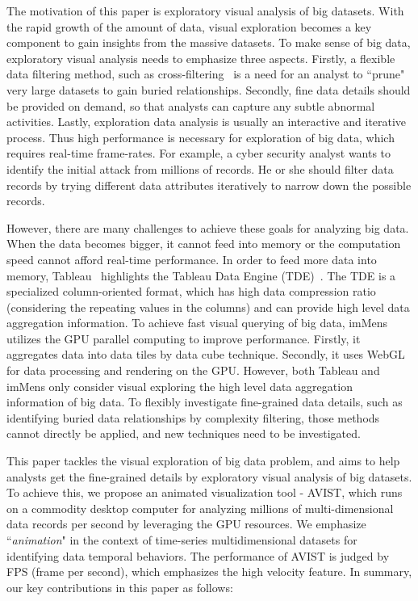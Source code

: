
\maketitle


The motivation of this paper is exploratory visual analysis of big datasets.  With the rapid growth of the amount of data,  visual exploration becomes a key component to gain insights from the massive datasets. To make sense of big data, exploratory visual analysis needs to emphasize three aspects. Firstly, a flexible data filtering method, such as cross-filtering~\cite{ weaver2008, weaver2010} is a need for an analyst to ``prune" very large datasets to gain buried relationships. Secondly, fine data details should be provided on demand, so that analysts can capture any subtle abnormal activities. Lastly, exploration data analysis is usually an interactive and iterative process. Thus high performance is necessary for exploration of big data, which requires real-time frame-rates. For example, a cyber security analyst wants to identify the initial attack from millions of records. He or she should filter data records by trying different data attributes iteratively to narrow down the possible records.  

However, there are many challenges to achieve these goals for analyzing big data.
 When the data becomes bigger, it cannot feed into memory or the computation speed cannot afford real-time performance. In order to feed more data into memory, Tableau~\cite{tab} highlights the Tableau Data Engine (TDE)~\cite{Wesley}. The TDE is a specialized column-oriented format, which has high data compression ratio (considering the repeating values in the columns) and can provide high level data aggregation information. To achieve fast visual querying of big data, imMens~\cite{2013-immens} utilizes the GPU parallel computing to improve performance. Firstly, it aggregates data into data tiles by data cube technique. Secondly, it uses WebGL for data processing and rendering on the GPU. However, both Tableau and imMens only consider visual exploring the high level data aggregation information of big data. To flexibly investigate fine-grained data details, such as identifying buried data relationships by complexity filtering, those methods cannot directly be applied, and new techniques need to be investigated.   

This paper tackles the visual exploration of big data problem,  and aims to help analysts  get the fine-grained details by exploratory visual analysis of big datasets. To achieve this, we propose an animated visualization tool - AVIST, which runs on a  commodity desktop computer for analyzing millions of multi-dimensional data records per second by leveraging the GPU resources. We emphasize ``\textit{animation}" in the context of time-series multidimensional datasets for identifying data temporal behaviors. The performance of AVIST is judged by FPS (frame per second), which emphasizes the high velocity feature. In summary, our key contributions in this paper as follows:

